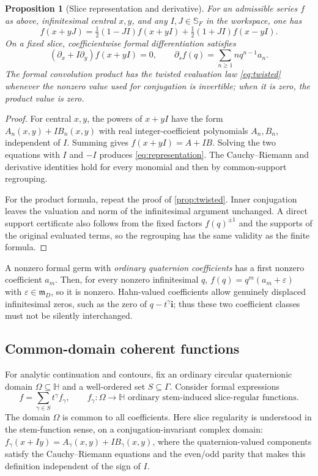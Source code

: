 \documentclass[11pt,letterpaper]{article}
\newtheorem{proposition}[theorem]{Proposition}
\theoremstyle{definition}
\newcommand{\HH}{\mathbb H}
\newcommand{\mm}{\mathfrak m}
\newcommand{\ii}{\mathbf i}
\newcommand{\Ss}{\mathbb S_F}
\begin{document}
\begin{proposition}[Slice representation and derivative]
\label{prop:representation}
For an admissible series $f$ as above, infinitesimal central $x,y$, and any
$I,J\in\Ss$ in the workspace, one has
\begin{equation}
 f(x+yJ)=\tfrac12(1-JI)f(x+yI)+\tfrac12(1+JI)f(x-yI).
 \label{eq:representation}
\end{equation}
On a fixed slice, coefficientwise formal differentiation satisfies
\[
 (\partial_x+I\partial_y)f(x+yI)=0,\qquad
 \partial_s f(q)=\sum_{n\ge1}nq^{n-1}a_n.
\]
The formal convolution product has the twisted evaluation law
\eqref{eq:twisted} whenever the nonzero value used for conjugation is
invertible; when it is zero, the product value is zero.
\end{proposition}
\begin{proof}
For central $x,y$, the powers of $x+yI$ have the form $A_n(x,y)+I B_n(x,y)$
with real integer-coefficient polynomials $A_n,B_n$, independent of $I$.
Summing gives $f(x+yI)=A+IB$. Solving the two equations with $I$ and $-I$
produces \eqref{eq:representation}. The Cauchy--Riemann and derivative identities
hold for every monomial and then by common-support regrouping.

For the product formula, repeat the proof of \cref{prop:twisted}. Inner
conjugation leaves the valuation and norm of the infinitesimal argument
unchanged. A direct support certificate also follows from the fixed factors
$f(q)^{\pm1}$ and the supports of the original evaluated terms, so the
regrouping has the same validity as the finite formula.
\end{proof}
A nonzero formal germ with \emph{ordinary quaternion coefficients} has a first
nonzero coefficient $a_m$. Then, for every nonzero infinitesimal $q$,
$f(q)=q^m(a_m+\varepsilon)$ with $\varepsilon\in\mm_D$, so it is nonzero.
Hahn-valued coefficients allow genuinely displaced infinitesimal zeros, such
as the zero of $q-t^\gamma\ii$; thus these two coefficient classes must not be
silently interchanged.

\subsection{Common-domain coherent functions}
For analytic continuation and contours, fix an ordinary circular quaternionic
domain $\Omega\subseteq\HH$ and a well-ordered set $S\subseteq\Gamma$. Consider
formal expressions
\begin{equation}
 f=\sum_{\gamma\in S}t^\gamma f_\gamma,
 \qquad f_\gamma:\Omega\to\HH
 \text{ ordinary stem-induced slice-regular functions}.
 \label{eq:coherent}
\end{equation}
The domain $\Omega$ is common to all coefficients. Here slice regularity is understood in the stem-function sense, on a
conjugation-invariant complex domain:
$f_\gamma(x+Iy)=A_\gamma(x,y)+I B_\gamma(x,y)$, where the quaternion-valued
components satisfy the Cauchy--Riemann equations and the even/odd parity that
makes this definition independent of the sign of $I$.
\end{document}
